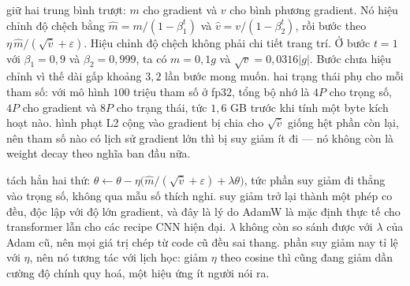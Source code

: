 \documentclass[../../../deep_learning.tex]{subfiles}
\begin{document}
\begin{mach}
\item {} \gp {} \cite{kingma2015adam} giữ hai trung bình trượt: \(m\) cho gradient và \(v\) cho bình phương gradient. Nó hiệu chỉnh độ chệch bằng \(\hat m = m/(1-\beta_1^t)\) và \(\hat v = v/(1-\beta_2^t)\), rồi bước theo \(\eta\,\hat m/(\sqrt{\hat v}+\varepsilon)\). Hiệu chỉnh độ chệch không phải chi tiết trang trí. Ở bước \(t=1\) với \(\beta_1 = 0{,}9\) và \(\beta_2 = 0{,}999\), ta có \(m = 0{,}1g\) và \(\sqrt{v} = 0{,}0316|g|\). Bước chưa hiệu chỉnh vì thế dài gấp khoảng \(3{,}2\) lần bước mong muốn. \gia hai trạng thái phụ cho mỗi tham số: với mô hình \(100\) triệu tham số ở fp32, tổng bộ nhớ là \(4P\) cho trọng số, \(4P\) cho gradient và \(8P\) cho trạng thái, tức \(1{,}6\) GB trước khi tính một byte kích hoạt nào. \vdm hình phạt L2 cộng vào gradient bị chia cho \(\sqrt{\hat v}\) giống hệt phần còn lại, nên tham số nào có lịch sử gradient lớn thì bị suy giảm ít đi --- nó không còn là weight decay theo nghĩa ban đầu nữa.
\item {} \gp {} \cite{loshchilov2019adamw} tách hẳn hai thứ: \(\theta \leftarrow \theta - \eta\big(\hat m/(\sqrt{\hat v}+\varepsilon) + \lambda\theta\big)\), tức phần suy giảm đi thẳng vào trọng số, không qua mẫu số thích nghi. \hq suy giảm trở lại thành một phép co đều, độc lập với độ lớn gradient, và đây là lý do AdamW là mặc định thực tế cho transformer lẫn cho các recipe CNN hiện đại. \gia \(\lambda\) không còn so sánh được với \(\lambda\) của Adam cũ, nên mọi giá trị chép từ code cũ đều sai thang. \vdm phần suy giảm nay tỉ lệ với \(\eta\), nên nó tương tác với lịch học: giảm \(\eta\) theo cosine thì cũng đang giảm dần cường độ chính quy hoá, một hiệu ứng ít người nói ra.
\end{mach}
\end{document}
